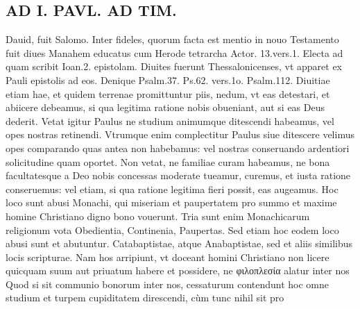 \documentclass{article}
\begin{document}
\begin{pages}
\section*{AD I. PAVL. AD TIM. }
\marginpar{[ p.440 ]}\pstart Dauid, fuit Salomo. Inter fideles, quorum facta est mentio in nouo Testamento fuit diues Manahem educatus cum Herode tetrarcha Actor. 13.vers.1. Electa ad quam scribit Ioan.2. epistolam. Diuites fuerunt Thessalonicenses, vt apparet ex Pauli epistolis ad eos. Denique Psalm.37. Ps.62. vers.1o. Psalm.112. Diuitiae etiam hae, et quidem terrenae promittuntur piis, nedum, vt eas detestari, et abiicere debeamus, si qua legitima ratione nobis obueniant, aut si eas Deus dederit.  \pend\pstart Vetat igitur Paulus ne studium animumque ditescendi habeamus, vel opes nostras retinendi. Vtrumque enim complectitur Paulus siue ditescere velimus opes comparando quas antea non habebamus: vel nostras conseruando ardentiori solicitudine quam oportet. Non vetat, ne familiae curam habeamus, ne bona facultatesque a Deo nobis concessas moderate tueamur, curemus, et iusta ratione conseruemus: vel etiam, si qua ratione legitima fieri possit, eas augeamus. Hoc loco sunt abusi Monachi, qui miseriam et paupertatem pro summo et maxime homine Christiano digno bono vouerunt. Tria sunt enim Monachicarum religionum vota Obedientia, Continenia, Paupertas. Sed etiam hoc eodem loco abusi sunt et abutuntur. Catabaptistae, atque  Anabaptistae, sed et aliis similibus locis scripturae. Nam hos arripiunt, vt doceant homini Christiano non licere quicquam suum aut priuatum habere et possidere, ne φιλοπλεσία alatur inter nos Quod si sit communio bonorum inter nos, cessaturum contendunt hoc omne studium et turpem cupiditatem direscendi, cùm tunc nihil sit pro\pend

\end{pages}
\end{document}
